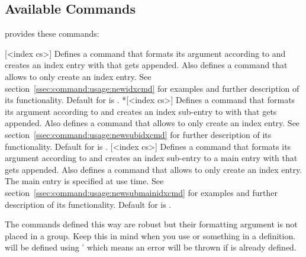 \documentclass{cnpkgdoc}
\begin{document}
\subsection{Available Commands}
\idxcmds provides these commands:
\begin{beschreibung}
 [<index cs>]{}\newline
   Defines a command  that formats its argument according to
    and creates an index entry with 
   that gets  appended. Also defines a command 
   that allows to only create an index entry. See section~\ref{ssec:command:usage:newidxcmd}
   for examples and further description of its functionality. Default for
    is .
 *[<index cs>]{}\newline
   Defines a command  that formats its argument according to
    and creates an index sub-entry to 
   with  that gets  appended. Also
   defines a command  that allows to only create an index entry.
   See section~\ref{ssec:command:usage:newsubidxcmd} for further description of
   its functionality. Default for  is .
 [<index cs>]{}\newline
   Defines a command  that formats its argument according to
    and creates an index sub-entry to a main entry with
    that gets  appended. Also defines a
   command  that allows to only create an index entry. The main entry
   is specified at use time. See section~\ref{ssec:command:usage:newsubmainidxcmd}
   for examples and further description of its functionality. Default for
    is .
\end{beschreibung}

The commands  defined this way are robust but their formatting argument
is not placed in a group. Keep this in mind when you use  or
something in a definition.  will be defined using '
 which means an error will be thrown if  is already
defined.
\end{document}
